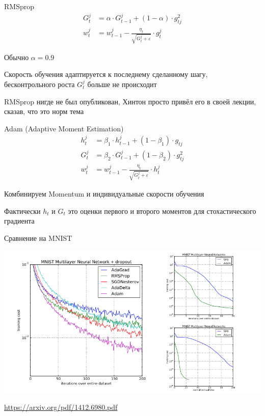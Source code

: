 \documentclass[notes,12pt, aspectratio=169]{beamer}
\newenvironment{wideitemize}{\itemize\addtolength{\itemsep}{10pt}}{\enditemize}
\begin{document}
\begin{frame}{RMSprop}
\begin{equation*}
\begin{aligned}
G_t^j &= \alpha \cdot G_{t-1}^j + (1 - \alpha) \cdot g_{tj}^2 \\
w_t^j &= w_{t-1}^j - \frac{\eta_t}{\sqrt{G_t^j + \varepsilon}} \cdot g_t^j
\end{aligned}	
\end{equation*}

\begin{wideitemize}
	\item Обычно $ \alpha = 0.9$
	\item Скорость обучения адаптируется к последнему сделанному шагу, бесконтрольного роста $G_t^j$ больше не происходит 
	\item RMSprop нигде не был опубликован, Хинтон просто привёл его в своей лекции, сказав, что это норм тема
\end{wideitemize}
\end{frame}


\begin{frame}{Adam (Adaptive Moment Estimation)}
\begin{equation*}
\begin{aligned}
h_t^j &= \beta_1 \cdot h_{t-1}^j + (1 - \beta_1) \cdot g_{tj} \\
G_t^j &= \beta_2 \cdot G_{t-1}^j + (1 - \beta_2) \cdot g_{tj}^2 \\
w_t^j &= w_{t-1}^j - \frac{\eta_t}{\sqrt{G_t^j + \varepsilon}} \cdot h_t^j
\end{aligned}	
\end{equation*}

\begin{wideitemize} 
\item Комбинируем Momentum и индивидуальные скорости обучения

\item Фактически $h_t$ и $G_t$ это оценки первого и второго моментов для стохастического градиента
\end{wideitemize}
\end{frame}


\begin{frame}{Сравнение на MNIST}
\begin{center}
	\includegraphics[scale=0.4]{adam_mnist.png}
\end{center}

\vfill %
\footnotesize
 {\color{blue} \url{https://arxiv.org/pdf/1412.6980.pdf}}
\end{frame}
\end{document}
